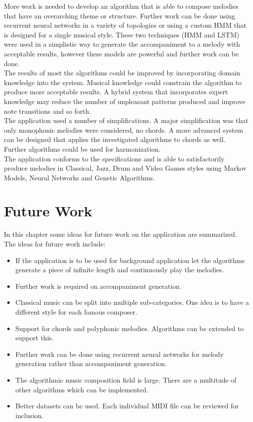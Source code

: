 More work is needed to develop an algorithm that is able to compose melodies that have an overarching theme or structure.  Further work can be done using recurrent neural networks in a variety of topologies or using a custom \ac{HMM} that is designed for a single musical style. 
These two techniques (\ac{HMM} and \ac{LSTM}) were used in a simplistic way to generate the accompaniment to a melody with acceptable results, however these models are powerful and further work can be done.
\\

The results of most the algorithms could be improved by incorporating domain knowledge into the system. Musical knowledge could constrain the algorithm to produce more acceptable results. A hybrid system that incorporates expert knowledge may reduce the number of unpleasant patterns produced and improve note transitions and so forth.
\\

The application used a number of simplifications. A major simplification was that only monophonic melodies were considered, no chords. A more advanced system can be designed that applies the investigated algorithms to chords as well. Further algorithms could be used for harmonization.
\\

The application conforms to the specifications and is able to satisfactorily produce melodies in Classical, Jazz, Drum and Video Games styles using Markov Models, Neural Networks and Genetic Algorithms.

\chapter{Future Work}

In this chapter some ideas for future work on the application are summarized.
The ideas for future work include:

\begin{itemize}
\item If the application is to be used for background application let the algorithms generate a piece of infinite length and continuously play the melodies.
\item Further work is required on accompaniment generation.
\item Classical music can be split into multiple sub-categories. One idea is to have a different style for each famous composer.
\item Support for chords and polyphonic melodies. Algorithms can be extended to support this.
\item Further work can be done using recurrent neural networks for melody generation rather than accompaniment generation.
\item The algorithmic music composition field is large. There are a multitude of other algorithms which can be implemented.
\item Better datasets can be used. Each individual \ac{MIDI} file can be reviewed for inclusion.
\end{itemize}